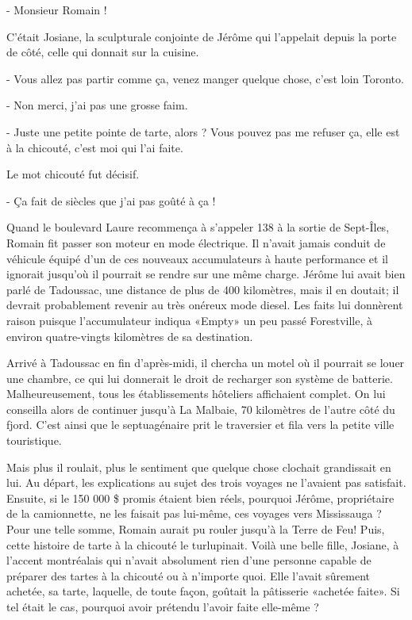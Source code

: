 - Monsieur Romain !

C’était Josiane, la sculpturale conjointe de Jérôme qui l’appelait depuis la porte de côté, celle qui donnait sur la cuisine.

- Vous allez pas partir comme ça, venez manger quelque chose, c’est loin Toronto.

- Non merci, j’ai pas une grosse faim.

- Juste une petite pointe de tarte, alors ? Vous pouvez pas me refuser ça, elle est à la chicouté, c’est moi qui l’ai faite.

Le mot chicouté fut décisif.

- Ça fait de siècles que j’ai pas goûté à ça !

Quand le boulevard Laure recommença à s’appeler 138 à la sortie de Sept-Îles, Romain fit passer son moteur en mode électrique. Il n’avait jamais conduit de véhicule équipé d’un de ces nouveaux accumulateurs à haute performance et il ignorait jusqu’où il pourrait se rendre sur une même charge. Jérôme lui avait bien parlé de Tadoussac, une distance de plus de 400 kilomètres, mais il en doutait; il devrait probablement revenir au très onéreux mode diesel. Les faits lui donnèrent raison puisque l’accumulateur indiqua «Empty» un peu passé Forestville, à environ quatre-vingts kilomètres de sa destination.

Arrivé à Tadoussac en fin d’après-midi, il chercha un motel où il pourrait se louer une chambre, ce qui lui donnerait le droit de recharger son système de batterie. Malheureusement, tous les établissements hôteliers affichaient complet. On lui conseilla alors de continuer jusqu’à La Malbaie, 70 kilomètres de l’autre côté du fjord. C’est ainsi que le septuagénaire prit le traversier et fila vers la petite ville touristique.

Mais plus il roulait, plus le sentiment que quelque chose clochait grandissait en lui. Au départ, les explications au sujet des trois voyages ne l’avaient pas satisfait. Ensuite, si le 150 000 \$ promis étaient bien réels, pourquoi Jérôme, propriétaire de la camionnette, ne les faisait pas lui-même, ces voyages vers Mississauga ? Pour une telle somme, Romain aurait pu rouler jusqu’à la Terre de Feu! Puis, cette histoire de tarte à la chicouté le turlupinait. Voilà une belle fille, Josiane, à l’accent montréalais qui n’avait absolument rien d’une personne capable de préparer des tartes à la chicouté ou à n’importe quoi. Elle l’avait sûrement achetée, sa tarte, laquelle, de toute façon, goûtait la pâtisserie «achetée faite». Si tel était le cas, pourquoi avoir prétendu l’avoir faite elle-même ?

